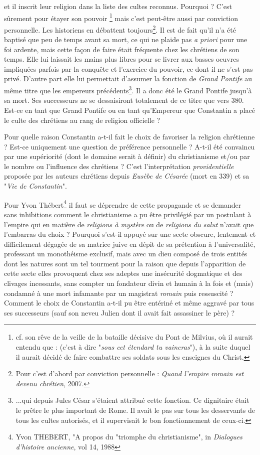 et il inscrit leur religion dans la liste des cultes reconnus. 
Pourquoi ? C'est sûrement pour étayer son pouvoir \footnote{cf. son rêve de la veille de la bataille décisive du Pont de Milvius, où il aurait entendu que :  (c'est à dire "\emph{sous cet étendard tu vaincras}"), à la suite duquel il aurait décidé de faire combattre ses soldats sous les enseignes du Christ.} mais c'est peut-être aussi par conviction personnelle. Les historiens en débattent toujours\footnote{Pour  c'est d'abord par conviction personnelle : \emph{Quand l'empire romain est devenu chrétien}, 2007.}. Il est de fait qu'il n'a été baptisé que peu de temps avant sa mort, ce qui ne plaide pas \emph{a priori} pour une foi ardente, mais cette façon de faire était fréquente chez les chrétiens de son temps. Elle lui laissait les mains plus libres pour se livrer aux basses oeuvres impliquées parfois par la conquête et l'exercice du pouvoir, ce dont il ne s'est pas privé. D'autre part elle lui permettait d'assumer la fonction de \emph{Grand Pontife} au même titre que les empereurs précédents\footnote{...qui depuis Jules César s'étaient attribué cette fonction. Ce dignitaire était le prêtre le plus important de Rome. Il avait le pas sur tous les desservants de tous les cultes autorisés, et il supervisait le bon fonctionnement de ceux-ci.}. Il a donc été le Grand Pontife jusqu'à sa mort. Ses successeurs ne se dessaisiront totalement de ce titre que vers 380. Est-ce en tant que Grand Pontife ou en tant qu'Empereur que Constantin a placé le culte des chrétiens au rang de religion officielle ? 

Pour quelle raison Constantin a-t-il fait le choix de favoriser la religion chrétienne ? Est-ce uniquement une question de préférence personnelle ? A-t-il été convaincu par une supériorité (dont le domaine serait à définir) du christianisme et/ou par le nombre ou l'influence des chrétiens ? C'est l'interprétation \emph{providentielle} proposée par les auteurs chrétiens depuis \emph{Eusèbe de Césarée} (mort en 339) et sa "\emph{Vie de Constantin}".

Pour Yvon Thébert\footnote{Yvon THEBERT, "A propos du "triomphe du christianisme", in \emph{Dialogues d'histoire ancienne}, vol 14, 1988} il faut se déprendre de cette propagande et se demander sans inhibitions comment le christianisme a pu être privilégié par un postulant à l'empire qui en matière de \emph{religions à mystère} ou de \emph{religions du salut} n'avait que l'embarras du choix ? Pourquoi s'est-il appuyé sur une secte obscure, lentement et difficilement dégagée de sa matrice juive en dépit de sa prétention à l'universalité, professant un monothéisme exclusif, mais avec un dieu composé de trois entités dont les natures sont un tel tourment pour la raison que depuis l'apparition de cette secte elles provoquent chez ses adeptes une insécurité dogmatique et des clivages incessants, sans compter un fondateur divin et humain à la fois et (mais) condamné à une mort infamante par un magistrat \emph{romain} puis ressuscité ?  Comment le choix de Constantin a-t-il pu être entériné et même aggravé par tous ses successeurs (sauf son neveu Julien dont il avait fait assassiner le père) ? 

